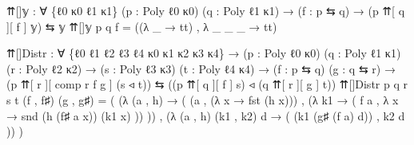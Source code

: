 \documentclass[
  11pt,
  oneside,
  article]{memoir}
\newenvironment{Shaded}{}{}
\newcommand{\NormalTok}[1]{#1}
\newcommand{\OtherTok}[1]{\textcolor[rgb]{0.00,0.44,0.13}{#1}}
\theoremstyle{definition}
\theoremstyle{plain}
\newcommand{\0}{\textsf{0}}
\newcommand{\1}{\tn{\textsf{1}}}
\begin{document}
\begin{Shaded}
\begin{Highlighting}[]
\NormalTok{⇈[]𝕪 }\OtherTok{:} \OtherTok{∀} \OtherTok{\{}\NormalTok{ℓ0 κ0 ℓ1 κ1}\OtherTok{\}} \OtherTok{(}\NormalTok{p }\OtherTok{:}\NormalTok{ Poly ℓ0 κ0}\OtherTok{)} \OtherTok{(}\NormalTok{q }\OtherTok{:}\NormalTok{ Poly ℓ1 κ1}\OtherTok{)} 
       \OtherTok{→} \OtherTok{(}\NormalTok{f }\OtherTok{:}\NormalTok{ p ⇆ q}\OtherTok{)} \OtherTok{→} \OtherTok{(}\NormalTok{p ⇈[ q ][ f ] 𝕪}\OtherTok{)}\NormalTok{ ⇆ 𝕪}
\NormalTok{⇈[]𝕪 p q f }\OtherTok{=} \OtherTok{((λ} \OtherTok{\_} \OtherTok{→}\NormalTok{ tt}\OtherTok{)}\NormalTok{ , }\OtherTok{λ} \OtherTok{\_} \OtherTok{\_} \OtherTok{\_} \OtherTok{→}\NormalTok{ tt}\OtherTok{)}
      

\NormalTok{⇈[]Distr }\OtherTok{:} \OtherTok{∀} \OtherTok{\{}\NormalTok{ℓ0 ℓ1 ℓ2 ℓ3 ℓ4 κ0 κ1 κ2 κ3 κ4}\OtherTok{\}}
           \OtherTok{→} \OtherTok{(}\NormalTok{p }\OtherTok{:}\NormalTok{ Poly ℓ0 κ0}\OtherTok{)} \OtherTok{(}\NormalTok{q }\OtherTok{:}\NormalTok{ Poly ℓ1 κ1}\OtherTok{)} \OtherTok{(}\NormalTok{r }\OtherTok{:}\NormalTok{ Poly ℓ2 κ2}\OtherTok{)}
           \OtherTok{→} \OtherTok{(}\NormalTok{s }\OtherTok{:}\NormalTok{ Poly ℓ3 κ3}\OtherTok{)} \OtherTok{(}\NormalTok{t }\OtherTok{:}\NormalTok{ Poly ℓ4 κ4}\OtherTok{)}
           \OtherTok{→} \OtherTok{(}\NormalTok{f }\OtherTok{:}\NormalTok{ p ⇆ q}\OtherTok{)} \OtherTok{(}\NormalTok{g }\OtherTok{:}\NormalTok{ q ⇆ r}\OtherTok{)}
           \OtherTok{→} \OtherTok{(}\NormalTok{p ⇈[ r ][ comp r f g ] }\OtherTok{(}\NormalTok{s ◃ t}\OtherTok{))} 
\NormalTok{             ⇆ }\OtherTok{((}\NormalTok{p ⇈[ q ][ f ] s}\OtherTok{)}\NormalTok{ ◃ }\OtherTok{(}\NormalTok{q ⇈[ r ][ g ] t}\OtherTok{))}
\NormalTok{⇈[]Distr p q r s t }\OtherTok{(}\NormalTok{f , f♯}\OtherTok{)} \OtherTok{(}\NormalTok{g , g♯}\OtherTok{)} \OtherTok{=} 
    \OtherTok{(} \OtherTok{(λ} \OtherTok{(}\NormalTok{a , h}\OtherTok{)} \OtherTok{→} \OtherTok{(} \OtherTok{(}\NormalTok{a , }\OtherTok{(λ}\NormalTok{ x }\OtherTok{→}\NormalTok{ fst }\OtherTok{(}\NormalTok{h x}\OtherTok{)))} 
\NormalTok{                   , }\OtherTok{(λ}\NormalTok{ k1 }\OtherTok{→} \OtherTok{(}\NormalTok{ f a , }\OtherTok{λ}\NormalTok{ x }\OtherTok{→}\NormalTok{ snd }\OtherTok{(}\NormalTok{h }\OtherTok{(}\NormalTok{f♯ a x}\OtherTok{))} 
                                               \OtherTok{(}\NormalTok{k1 x}\OtherTok{)} \OtherTok{))} \OtherTok{))} 
\NormalTok{    , }\OtherTok{(λ} \OtherTok{(}\NormalTok{a , h}\OtherTok{)} \OtherTok{(}\NormalTok{k1 , k2}\OtherTok{)}\NormalTok{ d }\OtherTok{→} \OtherTok{(} \OtherTok{(}\NormalTok{k1 }\OtherTok{(}\NormalTok{g♯ }\OtherTok{(}\NormalTok{f a}\OtherTok{)}\NormalTok{ d}\OtherTok{))}\NormalTok{ , k2 d }\OtherTok{))} \OtherTok{)}
\end{Highlighting}
\end{Shaded}
\end{document}
